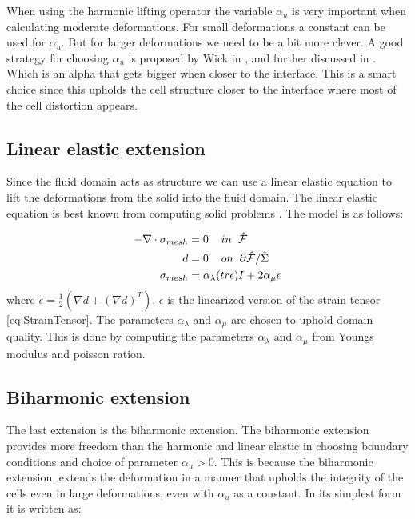 When using the harmonic lifting operator the variable $\alpha_u$ is very important when calculating moderate deformations. For small deformations a constant can be used for $\alpha_u$. But for larger deformations we need to be a bit more clever. A good strategy for choosing $\alpha_u$ is proposed by Wick in \cite{Wick2011a}, and further discussed in \cite{Stein2003}. Which is an alpha that gets bigger when closer to the interface. This is a smart choice since this upholds the cell structure closer to the interface where most of the cell distortion appears. 

\subsection{Linear elastic extension}
Since the fluid domain acts as structure we can use a linear elastic equation to lift the deformations from the solid into the fluid domain. The linear elastic equation is best known from computing solid problems \cite{Wick2011a}.  The model is as follows:

\begin{align}
-\nabla \cdot \sigma_{mesh} &= 0 \hspace{4mm} in \hspace{2mm} \hat{\mathcal{F}}\\
\hspace{4mm} d &= 0 \hspace{4mm } on \hspace{2mm }  \partial \hat{\mathcal{F}} / \hat{\Sigma} \\
\sigma_{mesh} &= \alpha_\lambda (tr\epsilon)I + 2\alpha_\mu \epsilon 
\end{align}
where $\epsilon = \frac{1}{2}(\nabla d + (\nabla d)^T)$. $\epsilon$ is the linearized version of the strain tensor \eqref{eq:StrainTensor}. The parameters $\alpha_\lambda$ and $\alpha_\mu$ are chosen to uphold domain quality. This is done by computing the parameters $\alpha_\lambda$ and $\alpha_\mu$ from Youngs modulus and poisson ration. 

\subsection{Biharmonic extension} 
The last extension is the biharmonic extension. The biharmonic extension provides more freedom than the harmonic and linear elastic in choosing boundary conditions and choice of parameter $\alpha_u > 0$. This is because the biharmonic extension, extends the deformation in a manner that upholds the integrity of the cells even in large deformations, even with $\alpha_u$ as a constant. In its simplest form it is written as:

